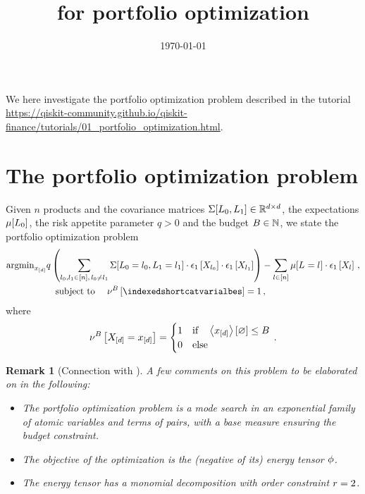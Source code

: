 \documentclass[aps,onecolumn,nofootinbib,pra]{article}
\newtheorem{remark}{Remark}
\begin{document}
    \title{\tnreason{} for portfolio optimization}

    \maketitle
    \date{\today}

    We here investigate the portfolio optimization problem described in the tutorial \url{https://qiskit-community.github.io/qiskit-finance/tutorials/01_portfolio_optimization.html}.


    \section{The portfolio optimization problem}

    \newcommand{\productsnum}{n}


    Given $\productsnum$ products and the covariance matrices $\Sigma[L_{0},L_{1}]\in\mathbb{R}^{d\times d}$, the expectations $\mu[L_{0}]$, the risk appetite parameter $q>0$ and the budget $B\in\mathbb{N}$, we state the portfolio optimization problem
    \begin{align}
        \argmin_{\shortcatindices} &
        q \left(\sum_{\selindexof{0},\selindexof{1}\in[\productsnum] , \, \selindexof{0}\neq\selindexof{1}}
        \Sigma[\indexedselvariableof{0},\indexedselvariableof{1}] \cdot \tbasisat{\catvariableof{\selindexof{0}}}\cdot \tbasisat{\catvariableof{\selindexof{1}}}\right)
        - \sum_{\selindex\in[\productsnum]} \mu[\indexedselvariable] \cdot \tbasisat{\catvariableof{\selindex}} \, , \\
        & \quad \text{subject to } \quad \basemeasureofat{B}{\indexedshortcatvarialbes} = 1 \, ,%
    \end{align}
    where
    \begin{align*}
        \nu^{B}\left[X_{[d]}=x_{[d]}\right] =
        \begin{cases}
            1 & \text{if}\quad \left\langle x_{[d]}\right\rangle \left[ \varnothing \right] \leq B \\
            0 & \text{else}
        \end{cases} \, .
    \end{align*}

    \begin{remark}[Connection with \tnreason{}]
        A few comments on this problem to be elaborated on in the following:
        \begin{itemize}
            \item  The portfolio optimization problem is a mode search in an exponential family of atomic variables and terms of pairs, with a base measure ensuring the budget constraint.
            \item The objective of the optimization is the (negative of its) energy tensor $\phi$.
            \item The energy tensor has a monomial decomposition with order constraint $r=2$.
        \end{itemize}
    \end{remark}
\end{document}
